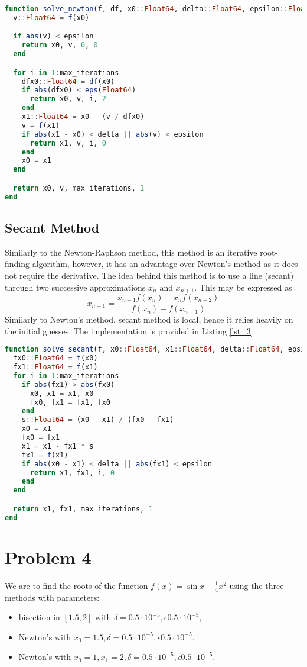 \documentclass[12pt, a4paper]{article}
\begin{document}
\begin{lstlisting}[language = Julia, caption = Implementation of the Newton-Raphson (tangent) method., label = lst_2]
function solve_newton(f, df, x0::Float64, delta::Float64, epsilon::Float64, max_iterations::Int)
  v::Float64 = f(x0)

  if abs(v) < epsilon
    return x0, v, 0, 0
  end

  for i in 1:max_iterations
    dfx0::Float64 = df(x0)
    if abs(dfx0) < eps(Float64)
      return x0, v, i, 2
    end
    x1::Float64 = x0 - (v / dfx0)
    v = f(x1)
    if abs(x1 - x0) < delta || abs(v) < epsilon
      return x1, v, i, 0
    end
    x0 = x1
  end

  return x0, v, max_iterations, 1
end
\end{lstlisting}

\subsection{Secant Method}
Similarly to the Newton-Raphson method, this method is an iterative root-finding
algorithm, however, it has an advantage over Newton's method as it does not
require the derivative. The idea behind this method is to use a line (secant)
through two successive approximations $x_n$ and $x_{n+1}$. This may be expressed
as
$$
x_{n+1} = \frac{x_{n-1}f(x_n) - x_n f(x_{n-2})}{f(x_n) - f(x_{n-1})}
$$
Similarly to Newton's method, secant method is local, hence it relies heavily on
the initial guesses. The implementation is provided in Listing \ref{lst_3}.

\begin{lstlisting}[language = Julia, caption = Implementation of the secant method., label = lst_3]
function solve_secant(f, x0::Float64, x1::Float64, delta::Float64, epsilon::Float64, max_iterations::Int)
  fx0::Float64 = f(x0)
  fx1::Float64 = f(x1)
  for i in 1:max_iterations
    if abs(fx1) > abs(fx0)
      x0, x1 = x1, x0
      fx0, fx1 = fx1, fx0
    end
    s::Float64 = (x0 - x1) / (fx0 - fx1)
    x0 = x1
    fx0 = fx1
    x1 = x1 - fx1 * s
    fx1 = f(x1)
    if abs(x0 - x1) < delta || abs(fx1) < epsilon
      return x1, fx1, i, 0
    end
  end

  return x1, fx1, max_iterations, 1
end
\end{lstlisting}

\section{Problem 4}
We are to find the roots of the function $f(x) = \sin x - \frac{1}{4}x^2$ using
the three methods with parameters:
\begin{itemize}
\item bisection in $[1.5, 2]$ with $\delta = 0.5 \cdot 10^{-5}, \epsilon 0.5 \cdot 10^{-5}$,
\item Newton's with $x_0 = 1.5, \delta = 0.5 \cdot 10^{-5}, \epsilon 0.5 \cdot 10^{-5}$,
\item Newton's with $x_0 = 1, x_1 = 2, \delta = 0.5 \cdot 10^{-5}, \epsilon 0.5 \cdot 10^{-5}$.
\end{itemize}
\end{document}

